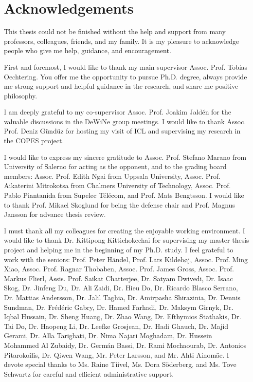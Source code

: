 \chapter{Acknowledgements}
This thesis could not be finished without the help and support from many professors, colleagues, friends, and my family. It is my pleasure to acknowledge people who give me help, guidance, and encouragement.

First and foremost, I would like to thank my main supervisor Assoc. Prof. Tobias Oechtering. You offer me the opportunity to pursue Ph.D. degree, always provide me strong support and helpful guidance in the research, and share me positive philosophy.

I am deeply grateful to my co-supervisor Assoc. Prof. Joakim Jald\'{e}n for the valuable discussions in the DeWiNe group meetings. I would like to thank Assoc. Prof. Deniz G\"{u}nd\"{u}z for hosting my visit of ICL and supervising my research in the COPES project.

I would like to express my sincere gratitude to Assoc. Prof. Stefano Marano from University of Salerno for acting as the opponent, and to the grading board members: Assoc. Prof. Edith Ngai from Uppsala University, Assoc. Prof. Aikaterini Mitrokotsa from Chalmers University of Technology, Assoc. Prof. Pablo Piantanida from Supelec T\'{e}l\'{e}com, and Prof. Mats Bengtsson. I would like to thank Prof. Mikael Skoglund for being the defense chair and Prof. Magnus Jansson for advance thesis review.

I must thank all my colleagues for creating the enjoyable working environment. I would like to thank Dr. Kittipong Kittichokechai for supervising my master thesis project and helping me in the beginning of my Ph.D. study. I feel grateful to work with the seniors: Prof. Peter H\"{a}ndel, Prof. Lars Kildeh\o j, Assoc. Prof. Ming Xiao, Assoc. Prof. Ragnar Thobaben, Assoc. Prof. James Gross, Assoc. Prof. Markus Flierl, Assis. Prof. Saikat Chatterjee, Dr. Satyam Dwivedi, Dr. Isaac Skog, Dr. Jinfeng Du, Dr. Ali Zaidi, Dr. Hieu Do, Dr. Ricardo Blasco Serrano, Dr. Mattias Andersson, Dr. Jalil Taghia, Dr. Amirpasha Shirazinia, Dr. Dennis Sundman, Dr. Fr\'{e}d\'{e}ric Gabry, Dr. Hamed Farhadi, Dr. Maksym Girnyk, Dr. Iqbal Hussain, Dr. Sheng Huang, Dr. Zhao Wang, Dr. Efthymios Stathakis, Dr. Tai Do, Dr. Haopeng Li, Dr. Leefke Grosjean, Dr. Hadi Ghauch, Dr. Majid Gerami, Dr. Alla Tarighati, Dr. Nima Najari Moghadam, Dr. Hussein Mohammed Al Zubaidy, Dr. Germ\'{a}n Bassi, Dr. Rami Mochaourab, Dr. Antonios Pitarokoilis, Dr. Qiwen Wang, Mr. Peter Larsson, and Mr. Ahti Ainom\"{a}e. I devote special thanks to Ms. Raine Tiivel, Ms. Dora S\"{o}derberg, and Ms. Tove Schwartz for careful and efficient administrative support.

